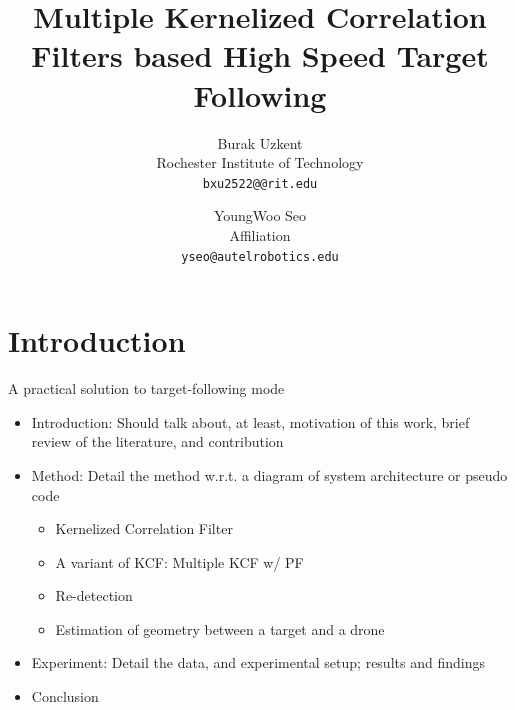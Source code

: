 \documentclass[10pt,twocolumn,letterpaper]{article}
\newcounter{ct}
\begin{document}
\title{Multiple Kernelized Correlation Filters based High Speed Target Following}

\author{Burak Uzkent\\
Rochester Institute of Technology\\
{\tt\small bxu2522@@rit.edu}
\and
YoungWoo Seo\\
Affiliation\\
{\tt\small yseo@autelrobotics.edu}
}

\maketitle

\begin{abstract}

\end{abstract}

\section{Introduction}

A practical solution to target-following mode

\begin{itemize}
\item Introduction: Should talk about, at least, motivation of this
  work, brief review of the literature, and contribution
\item Method: Detail the method w.r.t. a diagram of system
  architecture or pseudo code
\begin{itemize}
\item Kernelized Correlation Filter
\item A variant of KCF: Multiple KCF w/ PF
\item Re-detection
\item Estimation of geometry between a target and a drone
\end{itemize}
\item Experiment: Detail the data, and experimental setup; results and findings
\item Conclusion
\end{itemize}
\end{document}
